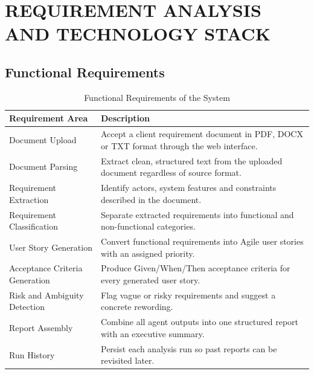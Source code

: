 \documentclass[12pt,a4paper,openany]{report}
\begin{document}
\chapter{REQUIREMENT ANALYSIS AND TECHNOLOGY STACK}

\section{Functional Requirements}
\begin{table}[H]
\centering
\caption{Functional Requirements of the System}
\label{tab:functional}
\begin{tabularx}{\textwidth}{|>{\raggedright\arraybackslash}p{3.6cm}|X|}
\hline
\textbf{Requirement Area} & \textbf{Description} \\
\hline
Document Upload & Accept a client requirement document in PDF, DOCX or TXT format through the web interface. \\
\hline
Document Parsing & Extract clean, structured text from the uploaded document regardless of source format. \\
\hline
Requirement Extraction & Identify actors, system features and constraints described in the document. \\
\hline
Requirement Classification & Separate extracted requirements into functional and non-functional categories. \\
\hline
User Story Generation & Convert functional requirements into Agile user stories with an assigned priority. \\
\hline
Acceptance Criteria Generation & Produce Given/When/Then acceptance criteria for every generated user story. \\
\hline
Risk and Ambiguity Detection & Flag vague or risky requirements and suggest a concrete rewording. \\
\hline
Report Assembly & Combine all agent outputs into one structured report with an executive summary. \\
\hline
Run History & Persist each analysis run so past reports can be revisited later. \\
\hline
\end{tabularx}
\end{table}
\end{document}
